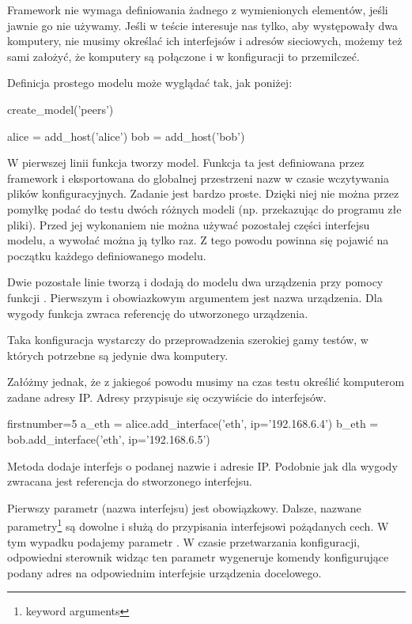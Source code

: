 \documentclass[00-praca-magisterska.tex]{subfiles}
\begin{document}
Framework nie wymaga definiowania żadnego z wymienionych elementów, jeśli
jawnie go nie używamy. Jeśli w teście interesuje nas tylko, aby występowały
dwa komputery, nie musimy określać ich interfejsów i adresów sieciowych,
możemy też sami założyć, że komputery są połączone i w konfiguracji to
przemilczeć.

Definicja prostego modelu może wyglądać tak, jak poniżej:

\begin{pythoncode}
  create_model('peers')

  alice = add_host('alice')
  bob   = add_host('bob')
\end{pythoncode}

W pierwszej linii funkcja  tworzy model. Funkcja ta jest
definiowana przez framework i eksportowana do globalnej przestrzeni nazw w
czasie wczytywania plików konfiguracyjnych. Zadanie  jest
bardzo proste. Dzięki niej nie można przez pomyłkę podać do testu dwóch
różnych modeli (np. przekazując do programu złe pliki). Przed jej wykonaniem
nie można używać pozostałej części interfejsu modelu, a wywołać można ją tylko
raz. Z tego powodu powinna się pojawić na początku każdego definiowanego
modelu.

Dwie pozostałe linie tworzą i dodają do modelu dwa urządzenia przy pomocy
funkcji . Pierwszym i obowiazkowym argumentem jest nazwa
urządzenia. Dla wygody funkcja zwraca referencję do utworzonego urządzenia.

Taka konfiguracja wystarczy do przeprowadzenia szerokiej gamy testów, w
których potrzebne są jedynie dwa komputery.

Załóżmy jednak, że z jakiegoś powodu musimy na czas testu określić komputerom
zadane adresy IP. Adresy przypisuje się oczywiście do interfejsów.

\begin{pythoncode*}{firstnumber=5}
  a_eth = alice.add_interface('eth', ip='192.168.6.4')
  b_eth = bob.add_interface('eth', ip='192.168.6.5')
\end{pythoncode*}

Metoda  dodaje interfejs o podanej nazwie i adresie IP.
Podobnie jak  dla wygody zwracana jest referencja do
stworzonego interfejsu.

Pierwszy parametr (nazwa interfejsu) jest obowiązkowy. Dalsze, nazwane
parametry\footnote{keyword arguments} są dowolne i służą do przypisania
interfejsowi pożądanych cech.  W tym wypadku podajemy parametr . W
czasie przetwarzania konfiguracji, odpowiedni sterownik widząc ten parametr
wygeneruje komendy konfigurujące podany adres na odpowiednim interfejsie
urządzenia docelowego.
\end{document}
